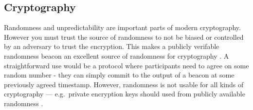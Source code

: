 \subsection{Cryptography}\label{subsec:usecase_cryptography}
Randomness and unpredictability are important parts of modern cryptography. 
 However you must trust the source of randomness to not be biased or controlled by an adversary to trust the encryption. This makes a publicly verifable randomness beacon an excellent source of randomness for cryptography . A straightforward use would be a protocol where participants need to agree on some random number - they can simply commit to the output of a beacon at some previously agreed timestamp. 
However, randomness is not usable for all kinds of cryptography --- e.g.\ private encryption keys should used from publicly available randomness . 

